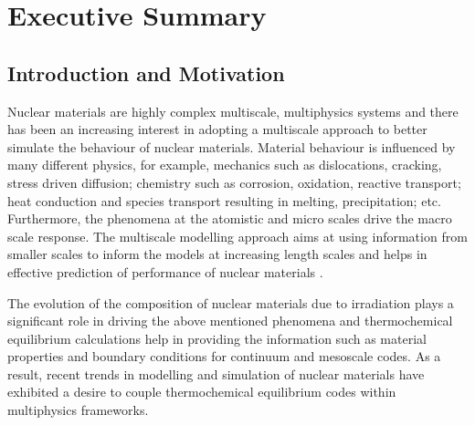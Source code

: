 \chapter*{Executive Summary}


\section*{Introduction and Motivation}
Nuclear materials are highly complex multiscale, multiphysics systems and there has been an increasing interest in adopting a multiscale approach to better simulate the behaviour of nuclear materials. Material behaviour is influenced by many different physics, for example, mechanics such as dislocations, cracking, stress driven diffusion; chemistry such as corrosion, oxidation, reactive transport; heat conduction and species transport resulting in melting, precipitation; etc. Furthermore, the phenomena at the atomistic and micro scales drive the macro scale response. The multiscale modelling approach aims at using information from smaller scales to inform the models at increasing length scales and helps in effective prediction of performance of nuclear materials \cite{STAN200920}.

The evolution of the composition of nuclear materials due to irradiation plays a significant role in driving the above mentioned phenomena and thermochemical equilibrium calculations help in providing the information such as material properties and boundary conditions for continuum and mesoscale codes. As a result, recent trends in modelling and simulation of nuclear materials have exhibited a desire to couple thermochemical equilibrium codes within multiphysics frameworks.

